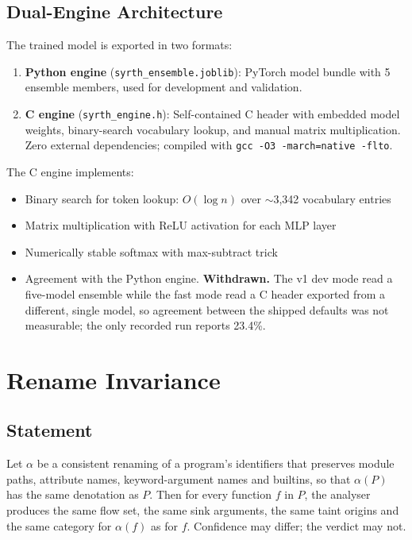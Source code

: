 \documentclass[12pt,a4paper]{article}
\begin{document}
\subsection{Dual-Engine Architecture}

The trained model is exported in two formats:

\begin{enumerate}
    \item \textbf{Python engine} (\texttt{syrth\_ensemble.joblib}): PyTorch model bundle with 5 ensemble members, used for development and validation.
    
    \item \textbf{C engine} (\texttt{syrth\_engine.h}): Self-contained C header with embedded model weights, binary-search vocabulary lookup, and manual matrix multiplication. Zero external dependencies; compiled with \texttt{gcc -O3 -march=native -flto}.
\end{enumerate}

The C engine implements:
\begin{itemize}
    \item Binary search for token lookup: $O(\log n)$ over $\sim$3,342 vocabulary entries
    \item Matrix multiplication with ReLU activation for each MLP layer
    \item Numerically stable softmax with max-subtract trick
    \item Agreement with the Python engine. \textbf{Withdrawn.} The v1 dev mode read
    a five-model ensemble while the fast mode read a C header exported from a
    different, single model, so agreement between the shipped defaults was not
    measurable; the only recorded run reports 23.4\%.
\end{itemize}

\section{Rename Invariance}
\label{sec:rename}

\subsection{Statement}

Let $\alpha$ be a consistent renaming of a program's identifiers that preserves
module paths, attribute names, keyword-argument names and builtins, so that
$\alpha(P)$ has the same denotation as $P$. Then for every function $f$ in $P$,
the analyser produces the same flow set, the same sink arguments, the same taint
origins and the same category for $\alpha(f)$ as for $f$. Confidence may differ;
the verdict may not.
\end{document}
